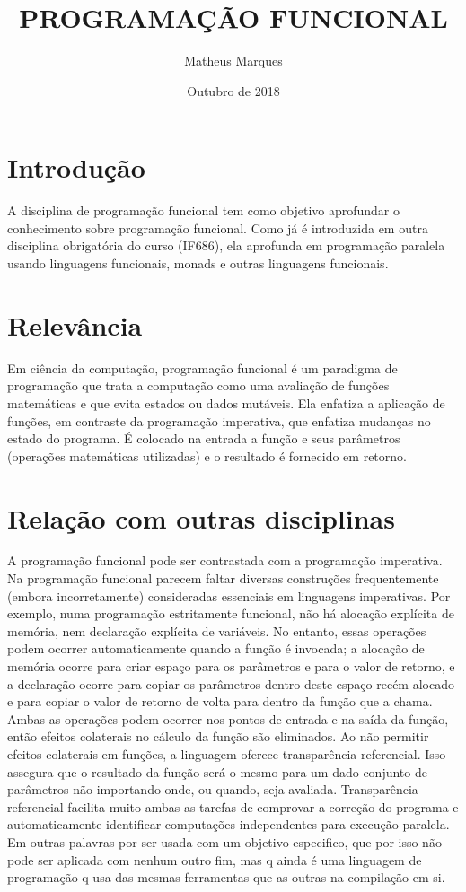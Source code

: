 \documentclass{article}[10pt]
\title{PROGRAMAÇÃO FUNCIONAL}
\author{Matheus Marques }
\date{Outubro de 2018}
\begin{document}
\maketitle

\section{Introdução}
A disciplina de programação funcional tem como objetivo aprofundar o conhecimento sobre programação funcional. Como já é introduzida em outra disciplina obrigatória do curso (IF686), ela aprofunda em programação paralela usando linguagens funcionais, monads e outras linguagens funcionais.

\section{Relevância}
 Em ciência da computação, programação funcional é um paradigma de programação que trata a computação como uma avaliação de funções matemáticas e que evita estados ou dados mutáveis. Ela enfatiza a aplicação de funções, em contraste da programação imperativa, que enfatiza mudanças no estado do programa. É colocado na entrada a função e seus parâmetros (operações matemáticas utilizadas) e o resultado é fornecido em retorno.  

\section{Relação com outras disciplinas}
A programação funcional pode ser contrastada com a programação imperativa. Na programação funcional parecem faltar diversas construções frequentemente (embora incorretamente) consideradas essenciais em linguagens imperativas. Por exemplo, numa programação estritamente funcional, não há alocação explícita de memória, nem declaração explícita de variáveis. No entanto, essas operações podem ocorrer automaticamente quando a função é invocada; a alocação de memória ocorre para criar espaço para os parâmetros e para o valor de retorno, e a declaração ocorre para copiar os parâmetros dentro deste espaço recém-alocado e para copiar o valor de retorno de volta para dentro da função que a chama. Ambas as operações podem ocorrer nos pontos de entrada e na saída da função, então efeitos colaterais no cálculo da função são eliminados. Ao não permitir efeitos colaterais em funções, a linguagem oferece transparência referencial. Isso assegura que o resultado da função será o mesmo para um dado conjunto de parâmetros não importando onde, ou quando, seja avaliada. Transparência referencial facilita muito ambas as tarefas de comprovar a correção do programa e automaticamente identificar computações independentes para execução paralela. Em outras palavras por ser usada com um objetivo especifico, que por isso não pode ser aplicada com nenhum outro fim, mas q ainda é uma linguagem de programação q usa das mesmas ferramentas que as outras na compilação em si.  
\end{document}
